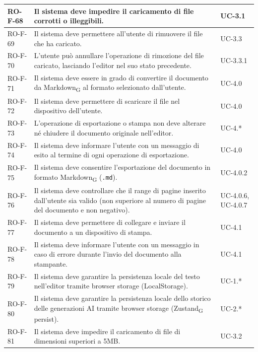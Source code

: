 \documentclass[11pt,a4paper]{article}
\newcommand{\gls}[1]{#1\textsubscript{G}}
\begin{document}
\begin{longtable}{|p{}|>{\raggedright\arraybackslash}p{}|p{}|}
RO-F-68 & Il sistema deve impedire il caricamento di file corrotti o illeggibili. & UC-3.1 \\
\hline
RO-F-69 & Il sistema deve permettere all'utente di rimuovere il file che ha caricato. & UC-3.3 \\
\hline
RO-F-70 & L'utente può annullare l'operazione di rimozione del file caricato, lasciando l'editor nel suo stato precedente. & UC-3.3.1 \\
\hline
RO-F-71 & Il sistema deve essere in grado di convertire il documento da \gls{Markdown} al formato selezionato dall'utente. & UC-4.0 \\
\hline
RO-F-72 & Il sistema deve permettere di scaricare il file nel dispositivo dell'utente. & UC-4.0 \\
\hline
RO-F-73 & L'operazione di esportazione o stampa non deve alterare né chiudere il documento originale nell'editor. & UC-4.* \\
\hline
RO-F-74 & Il sistema deve informare l'utente con un messaggio di esito al termine di ogni operazione di esportazione. & UC-4.0 \\
\hline
RO-F-75 & Il sistema deve consentire l'esportazione del documento in formato \gls{Markdown} (\texttt{.md}). & UC-4.0.2 \\
\hline
RO-F-76 & Il sistema deve controllare che il range di pagine inserito dall'utente sia valido (non superiore al numero di pagine del documento e non negativo). & UC-4.0.6, UC-4.0.7 \\
\hline
RO-F-77 & Il sistema deve permettere di collegare e inviare il documento a un dispositivo di stampa. & UC-4.1 \\
\hline
RO-F-78 & Il sistema deve informare l'utente con un messaggio in caso di errore durante l'invio del documento alla stampante. & UC-4.1 \\
\hline
RO-F-79 & Il sistema deve garantire la persistenza locale del testo nell'editor tramite browser storage (LocalStorage). & UC-1.* \\
\hline
RO-F-80 & Il sistema deve garantire la persistenza locale dello storico delle generazioni AI tramite browser storage (\gls{Zustand} persist). & UC-2.* \\
\hline
RO-F-81 & Il sistema deve impedire il caricamento di file di dimensioni superiori a 5MB. & UC-3.2 \\
\hline


\end{longtable}
\end{document}
